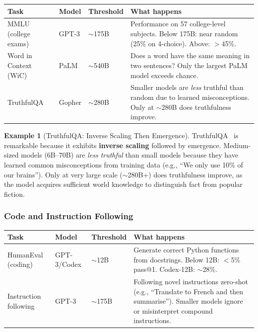 \documentclass[11pt, a4paper]{article}
\theoremstyle{definition}
\newtheorem{example}{Example}[section]
\theoremstyle{plain}
\begin{document}
\begin{center}
\begin{tabular}{p{4cm}llp{5cm}}
  \toprule
  \textbf{Task} & \textbf{Model} & \textbf{Threshold} & \textbf{What happens} \\
  \midrule
  MMLU (college exams) & GPT-3 & ${\sim}$175B & Performance on 57 college-level subjects. Below 175B: near random (25\% on 4-choice). Above: $>$45\%. \\[0.5em]
  Word in Context (WiC) & PaLM & ${\sim}$540B & Does a word have the same meaning in two sentences? Only the largest PaLM model exceeds chance. \\[0.5em]
  TruthfulQA & Gopher & ${\sim}$280B & Smaller models are \emph{less} truthful than random due to learned misconceptions. Only at ${\sim}$280B does truthfulness improve. \\
  \bottomrule
\end{tabular}
\end{center}

\begin{example}[TruthfulQA: Inverse Scaling Then Emergence]
TruthfulQA~\cite{lin2022truthfulqa} is remarkable because it exhibits \textbf{inverse scaling} followed by emergence. Medium-sized models (6B--70B) are \emph{less truthful} than small models because they have learned common misconceptions from training data (e.g., ``We only use 10\% of our brains''). Only at very large scale (${\sim}$280B+) does truthfulness improve, as the model acquires sufficient world knowledge to distinguish fact from popular fiction.
\end{example}

\subsubsection{Code and Instruction Following}

\begin{center}
\begin{tabular}{p{4cm}llp{5cm}}
  \toprule
  \textbf{Task} & \textbf{Model} & \textbf{Threshold} & \textbf{What happens} \\
  \midrule
  HumanEval (coding) & GPT-3/Codex & ${\sim}$12B & Generate correct Python functions from docstrings. Below 12B: $<$5\% pass@1. Codex-12B: ${\sim}$28\%. \\[0.5em]
  Instruction following & GPT-3 & ${\sim}$175B & Following novel instructions zero-shot (e.g., ``Translate to French and then summarise''). Smaller models ignore or misinterpret compound instructions. \\
  \bottomrule
\end{tabular}
\end{center}
\end{document}

